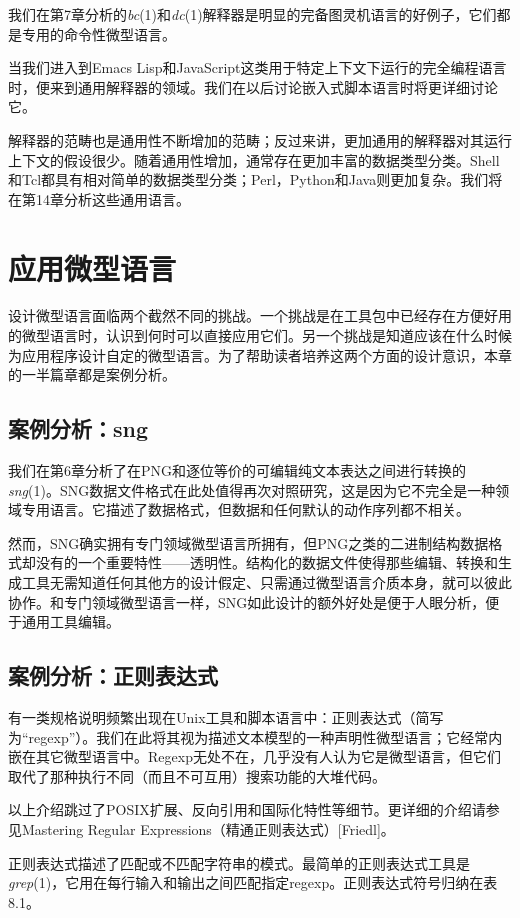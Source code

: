 \documentclass[12pt,oneside]{book}
\begin{document}
\begin{common-format}
我们在第7章分析的\textit{bc}(1)和\textit{dc}(1)解释器是明显的完备图灵机语言的好例子，它们都是专用的命令性微型语言。

当我们进入到Emacs Lisp和JavaScript这类用于特定上下文下运行的完全编程语言时，便来到通用解释器的领域。我们在以后讨论嵌入式脚本语言时将更详细讨论它。

解释器的范畴也是通用性不断增加的范畴；反过来讲，更加通用的解释器对其运行上下文的假设很少。随着通用性增加，通常存在更加丰富的数据类型分类。Shell和Tcl都具有相对简单的数据类型分类；Perl，Python和Java则更加复杂。我们将在第14章分析这些通用语言。


\section{应用微型语言}
设计微型语言面临两个截然不同的挑战。一个挑战是在工具包中已经存在方便好用的微型语言时，认识到何时可以直接应用它们。另一个挑战是知道应该在什么时候为应用程序设计自定的微型语言。为了帮助读者培养这两个方面的设计意识，本章的一半篇章都是案例分析。

\subsection{案例分析：sng}
我们在第6章分析了在PNG和逐位等价的可编辑纯文本表达之间进行转换的\textit{sng}(1)。SNG数据文件格式在此处值得再次对照研究，这是因为它不完全是一种领域专用语言。它描述了数据格式，但数据和任何默认的动作序列都不相关。

然而，SNG确实拥有专门领域微型语言所拥有，但PNG之类的二进制结构数据格式却没有的一个重要特性——透明性。结构化的数据文件使得那些编辑、转换和生成工具无需知道任何其他方的设计假定、只需通过微型语言介质本身，就可以彼此协作。和专门领域微型语言一样，SNG如此设计的额外好处是便于人眼分析，便于通用工具编辑。

\subsection{案例分析：正则表达式}
有一类规格说明频繁出现在Unix工具和脚本语言中：正则表达式（简写为“regexp”）。我们在此将其视为描述文本模型的一种声明性微型语言；它经常内嵌在其它微型语言中。Regexp无处不在，几乎没有人认为它是微型语言，但它们取代了那种执行不同（而且不可互用）搜索功能的大堆代码。

以上介绍跳过了POSIX扩展、反向引用和国际化特性等细节。更详细的介绍请参见Mastering  Regular Expressions（精通正则表达式）[Friedl]。

正则表达式描述了匹配或不匹配字符串的模式。最简单的正则表达式工具是\textit{grep}(1)，它用在每行输入和输出之间匹配指定regexp。正则表达式符号归纳在表8.1。


\end{common-format}
\end{document}

